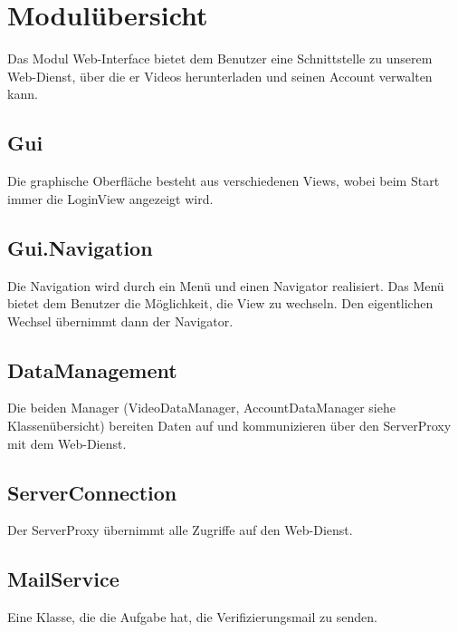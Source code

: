 \section{Modulübersicht} \label{interface:modul}
Das Modul Web-Interface bietet dem Benutzer eine Schnittstelle zu unserem Web-Dienst, über die er Videos herunterladen und seinen Account verwalten kann. 

\subsection{Gui}
Die graphische Oberfläche besteht aus verschiedenen Views, wobei beim Start immer die LoginView angezeigt wird. 

\subsection{Gui.Navigation}
Die Navigation wird durch ein Menü und einen Navigator realisiert. Das Menü bietet dem Benutzer die Möglichkeit, die View zu wechseln. Den eigentlichen Wechsel übernimmt dann der Navigator.

\subsection{DataManagement}
Die beiden Manager (VideoDataManager, AccountDataManager siehe Klassenübersicht) bereiten Daten auf und kommunizieren über den ServerProxy mit dem Web-Dienst.

\subsection{ServerConnection}
Der ServerProxy übernimmt alle Zugriffe auf den Web-Dienst.

\subsection{MailService}
Eine Klasse, die die Aufgabe hat, die Verifizierungsmail zu senden.
\newpage

